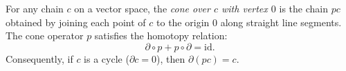 For any chain $c$ on a vector space, the \textit{cone over $c$ with vertex $0$} is the chain $pc$ obtained by joining each point of $c$ to the origin $0$ along straight line segments. The cone operator $p$ satisfies the homotopy relation:
$$\partial \circ p + p \circ \partial = \text{id}.$$
Consequently, if $c$ is a cycle ($\partial c = 0$), then $\partial(pc) = c$.

